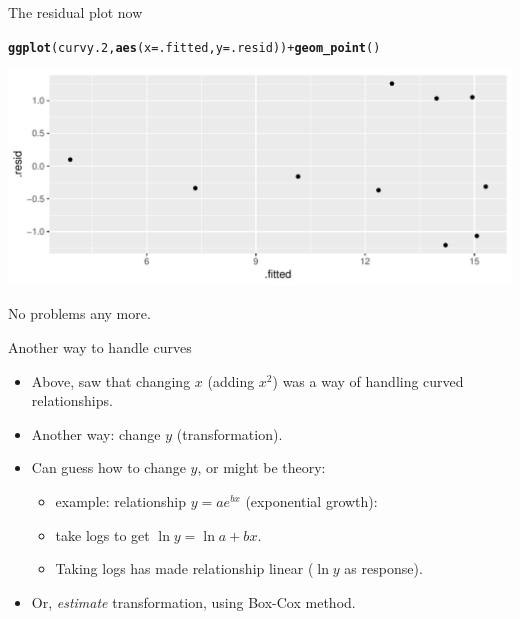 \documentclass[unknownkeysallowed]{beamer}\usepackage[]{graphicx}\usepackage[]{color}
\makeatletter
\def\maxwidth{ %
  \ifdim\Gin@nat@width>\linewidth
    \linewidth
  \else
    \Gin@nat@width
  \fi
}
\newcommand{\hlopt}[1]{\textcolor[rgb]{0,0,0}{#1}}%
\newcommand{\hlstd}[1]{\textcolor[rgb]{0.345,0.345,0.345}{#1}}%
\newcommand{\hlkwc}[1]{\textcolor[rgb]{0.333,0.667,0.333}{#1}}%
\newcommand{\hlkwd}[1]{\textcolor[rgb]{0.737,0.353,0.396}{\textbf{#1}}}%
\newenvironment{kframe}{%
 \def\at@end@of@kframe{}%
 \ifinner\ifhmode%
  \def\at@end@of@kframe{\end{minipage}}%
  \begin{minipage}{\columnwidth}%
 \fi\fi%
 \def\FrameCommand##1{\hskip\@totalleftmargin \hskip-\fboxsep
 \colorbox{shadecolor}{##1}\hskip-\fboxsep
     \hskip-\linewidth \hskip-\@totalleftmargin \hskip\columnwidth}%
 \MakeFramed {\advance\hsize-\width
   \@totalleftmargin\z@ \linewidth\hsize
   \@setminipage}}%
 {\par\unskip\endMakeFramed%
 \at@end@of@kframe}
\newenvironment{knitrout}{}{} %
\makeatother
\begin{document}
\begin{frame}[fragile]{The residual plot now}

  
 
\begin{knitrout}\small
{}\color{fgcolor}\begin{kframe}
\begin{alltt}
\hlkwd{ggplot}\hlstd{(curvy.2,}\hlkwd{aes}\hlstd{(}\hlkwc{x}\hlstd{=.fitted,}\hlkwc{y}\hlstd{=.resid))}\hlopt{+}\hlkwd{geom_point}\hlstd{()}
\end{alltt}
\end{kframe}
\includegraphics[width=\maxwidth]{figure/unnamed-chunk-19-1} 

\end{knitrout}


No problems any more.  

\end{frame}

\begin{frame}[fragile]{Another way to handle curves}
  
  \begin{itemize}
  \item Above, saw that changing $x$ (adding $x^2$) was a way of
    handling curved relationships.
  \item Another way: change $y$ (transformation).
  \item Can guess how to change $y$, or might be theory:
    \begin{itemize}
    \item example: relationship $y=ae^{bx}$ (exponential growth): 

    \item take
      logs to get $\ln y=\ln a + bx$.
    \item Taking logs has made relationship linear ($\ln y$ as response).
    \end{itemize}
  \item Or, \emph{estimate} transformation, using Box-Cox method. 
  \end{itemize}
  
\end{frame}
\end{document}
